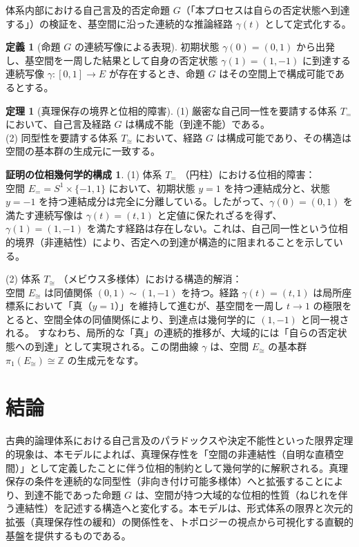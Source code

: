 \documentclass[11pt,a4paper]{article}
\theoremstyle{definition}
\newtheorem{definition}{定義}[section]
\newtheorem{theorem}{定理}[section]
\newtheorem{proof_topological}{証明の位相幾何学的構成}
\begin{document}
体系内部における自己言及的否定命題 $G$（「本プロセスは自らの否定状態へ到達する」）の検証を、基空間に沿った連続的な推論経路 $\gamma(t)$ として定式化する。

\begin{definition}[命題 $G$ の連続写像による表現]
初期状態 $\gamma(0) = (0, 1)$ から出発し、基空間を一周した結果として自身の否定状態 $\gamma(1) = (1, -1)$ に到達する連続写像 $\gamma: [0, 1] \to E$ が存在するとき、命題 $G$ はその空間上で構成可能であるとする。
\end{definition}

\begin{theorem}[真理保存の境界と位相的障害]
\label{thm:mobius_incompleteness}
(1) 厳密な自己同一性を要請する体系 $T_{=}$ において、自己言及経路 $G$ は構成不能（到達不能）である。\\
(2) 同型性を要請する体系 $T_{\cong}$ において、経路 $G$ は構成可能であり、その構造は空間の基本群の生成元に一致する。
\end{theorem}

\begin{proof_topological}
(1) 体系 $T_{=}$ （円柱）における位相的障害：\\
空間 $E_{=} = S^1 \times \{-1, 1\}$ において、初期状態 $y=1$ を持つ連結成分と、状態 $y=-1$ を持つ連結成分は完全に分離している。したがって、$\gamma(0) = (0, 1)$ を満たす連続写像は $\gamma(t) = (t, 1)$ と定値に保たれざるを得ず、$\gamma(1) = (1, -1)$ を満たす経路は存在しない。これは、自己同一性という位相的境界（非連結性）により、否定への到達が構造的に阻まれることを示している。

(2) 体系 $T_{\cong}$ （メビウス多様体）における構造的解消：\\
空間 $E_{\cong}$ は同値関係 $(0, 1) \sim (1, -1)$ を持つ。経路 $\gamma(t) = (t, 1)$ は局所座標系において「真（$y=1$）」を維持して進むが、基空間を一周し $t \to 1$ の極限をとると、空間全体の同値関係により、到達点は幾何学的に $(1, -1)$ と同一視される。
すなわち、局所的な「真」の連続的推移が、大域的には「自らの否定状態への到達」として実現される。この閉曲線 $\gamma$ は、空間 $E_{\cong}$ の基本群 $\pi_1(E_{\cong}) \cong \mathbb{Z}$ の生成元をなす。
\end{proof_topological}

\section{結論}

古典的論理体系における自己言及のパラドックスや決定不能性といった限界定理的現象は、本モデルによれば、真理保存性を「空間の非連結性（自明な直積空間）」として定義したことに伴う位相的制約として幾何学的に解釈される。真理保存の条件を連続的な同型性（非向き付け可能多様体）へと拡張することにより、到達不能であった命題 $G$ は、空間が持つ大域的な位相的性質（ねじれを伴う連結性）を記述する構造へと変化する。本モデルは、形式体系の限界と次元的拡張（真理保存性の緩和）の関係性を、トポロジーの視点から可視化する直観的基盤を提供するものである。
\end{document}
